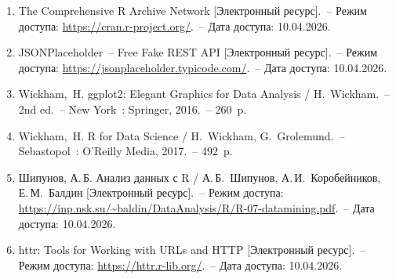 \documentclass[14pt,a4paper]{extarticle}
\begin{document}
\begin{enumerate}[label=\arabic*,leftmargin=1.25cm]
  \item The Comprehensive R Archive Network [Электронный ресурс].~-- Режим доступа: \url{https://cran.r-project.org/}.~-- Дата доступа: 10.04.2026.
  \item JSONPlaceholder~-- Free Fake REST API [Электронный ресурс].~-- Режим доступа: \url{https://jsonplaceholder.typicode.com/}.~-- Дата доступа: 10.04.2026.
  \item Wickham,~H. ggplot2: Elegant Graphics for Data Analysis / H.~Wickham.~-- 2nd ed.~-- New York~: Springer, 2016.~-- 260~p.
  \item Wickham,~H. R for Data Science / H.~Wickham, G.~Grolemund.~-- Sebastopol~: O'Reilly Media, 2017.~-- 492~p.
  \item Шипунов, А.\,Б. Анализ данных с R / А.\,Б.~Шипунов, А.\,И.~Коробейников, Е.\,М.~Балдин [Электронный ресурс].~-- Режим доступа: \url{https://inp.nsk.su/~baldin/DataAnalysis/R/R-07-datamining.pdf}.~-- Дата доступа: 10.04.2026.
  \item httr: Tools for Working with URLs and HTTP [Электронный ресурс].~-- Режим доступа: \url{https://httr.r-lib.org/}.~-- Дата доступа: 10.04.2026.
\end{enumerate}
\end{document}
